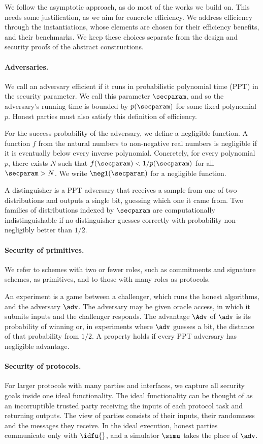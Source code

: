 We follow the asymptotic approach, as do most of the works we build on. This
needs some justification, as we aim for concrete efficiency. We address efficiency through the instantiations, whose elements are
chosen for their efficiency benefits, and their benchmarks. We keep these
choices separate from the design and security proofs of the abstract
constructions.

\paragraph{Adversaries.} We call an adversary efficient if it runs in
probabilistic polynomial time (PPT) in the security parameter. We call this
parameter $\secparam$, and so the adversary's running time is bounded by
$p(\secparam)$ for some fixed polynomial $p$.
Honest parties must also satisfy this definition of efficiency.

For the success probability of the adversary, we define a negligible
function. A function $f$ from the natural
numbers to non-negative real numbers is negligible if it is eventually below every
inverse polynomial. Concretely, for every
polynomial $p$, there exists $N$ such that $f(\secparam) < 1/p(\secparam)$ for
all $\secparam > N$. We write $\negl(\secparam)$ for a negligible
function.

A distinguisher is a PPT adversary that receives a sample from one of two
distributions and outputs a single bit, guessing which one it came from. Two
families of distributions indexed by $\secparam$ are computationally
indistinguishable if no distinguisher guesses correctly with probability
non-negligibly better than $1/2$.

\paragraph{Security of primitives.} We refer to schemes with two or fewer
roles, such as commitments and signature schemes, as primitives, and to those
with many roles as protocols.

An experiment is a game between a challenger,
which runs the honest algorithms, and the adversary $\adv$. The adversary may be
given oracle access, in which it submits inputs and the challenger responds. The advantage $\Adv$ of $\adv$ is its probability of
winning or, in experiments where $\adv$ guesses a bit, the distance of that probability from $1/2$. A property holds if every PPT adversary has negligible advantage.

\paragraph{Security of protocols.} For larger protocols with many parties
and interfaces, we capture all security goals inside one ideal functionality.
The ideal functionality can be thought of as an incorruptible trusted party
receiving the inputs of each protocol task and returning outputs. The view of
parties consists of their inputs, their randomness and the messages they
receive. In the ideal execution, honest parties communicate only with
$\idfu{}$, and a simulator $\simu$ takes the place of $\adv$.

